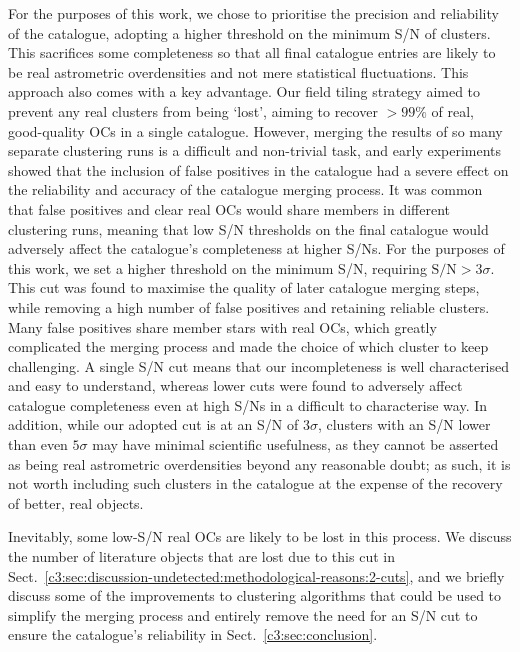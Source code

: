 For the purposes of this work, we chose to prioritise the precision and reliability of the catalogue, adopting a higher threshold on the minimum S/N of clusters. This sacrifices some completeness so that all final catalogue entries are likely to be real astrometric overdensities and not mere statistical fluctuations. This approach also comes with a key advantage. Our field tiling strategy aimed to prevent any real clusters from being `lost', aiming to recover $>99\%$ of real, good-quality OCs in a single catalogue. However, merging the results of so many separate clustering runs is a difficult and non-trivial task, and early experiments showed that the inclusion of false positives in the catalogue had a severe effect on the reliability and accuracy of the catalogue merging process. It was common that false positives and clear real OCs would share members in different clustering runs, meaning that low S/N thresholds on the final catalogue would adversely affect the catalogue's completeness at higher S/Ns. For the purposes of this work, we set a higher threshold on the minimum S/N, requiring $\text{S/N}>3\sigma$. This cut was found to maximise the quality of later catalogue merging steps, while removing a high number of false positives and retaining reliable clusters. Many false positives share member stars with real OCs, which greatly complicated the merging process and made the choice of which cluster to keep challenging. A single S/N cut means that our incompleteness is well characterised and easy to understand, whereas lower cuts were found to adversely affect catalogue completeness even at high S/Ns in a difficult to characterise way. In addition, while our adopted cut is at an S/N of $3\sigma$, clusters with an S/N lower than even $5\sigma$ may have minimal scientific usefulness, as they cannot be asserted as being real astrometric overdensities beyond any reasonable doubt; as such, it is not worth including such clusters in the catalogue at the expense of the recovery of better, real objects.

Inevitably, some low-S/N real OCs are likely to be lost in this process. We discuss the number of literature objects that are lost due to this cut in Sect.~\ref{c3:sec:discussion-undetected:methodological-reasons:2-cuts}, and we briefly discuss some of the improvements to clustering algorithms that could be used to simplify the merging process and entirely remove the need for an S/N cut to ensure the catalogue's reliability in Sect.~\ref{c3:sec:conclusion}.


